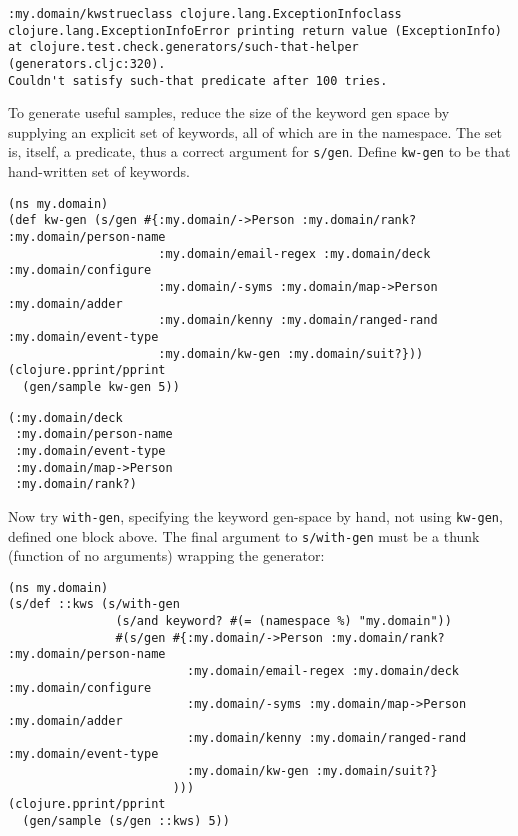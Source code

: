 \documentclass[10pt,oneside,x11names]{article}
\begin{document}
\begin{verbatim}
:my.domain/kwstrueclass clojure.lang.ExceptionInfoclass clojure.lang.ExceptionInfoError printing return value (ExceptionInfo) at clojure.test.check.generators/such-that-helper (generators.cljc:320).
Couldn't satisfy such-that predicate after 100 tries.
\end{verbatim}


To generate useful samples, reduce the size of the keyword gen space by
supplying an explicit set of keywords, all of which are in the namespace. The
set is, itself, a predicate, thus a correct argument for \texttt{s/gen}. Define
\texttt{kw-gen} to be that hand-written set of keywords.

\begin{verbatim}
(ns my.domain)
(def kw-gen (s/gen #{:my.domain/->Person :my.domain/rank? :my.domain/person-name
                     :my.domain/email-regex :my.domain/deck :my.domain/configure
                     :my.domain/-syms :my.domain/map->Person :my.domain/adder
                     :my.domain/kenny :my.domain/ranged-rand :my.domain/event-type
                     :my.domain/kw-gen :my.domain/suit?}))
(clojure.pprint/pprint
  (gen/sample kw-gen 5))
\end{verbatim}

\begin{verbatim}
(:my.domain/deck
 :my.domain/person-name
 :my.domain/event-type
 :my.domain/map->Person
 :my.domain/rank?)
\end{verbatim}


Now try \texttt{with-gen}, specifying the keyword gen-space by hand, not using
\texttt{kw-gen}, defined one block above. The final argument
to \texttt{s/with-gen} must be a thunk (function of no arguments) wrapping the generator:

\begin{verbatim}
(ns my.domain)
(s/def ::kws (s/with-gen
               (s/and keyword? #(= (namespace %) "my.domain"))
               #(s/gen #{:my.domain/->Person :my.domain/rank? :my.domain/person-name
                         :my.domain/email-regex :my.domain/deck :my.domain/configure
                         :my.domain/-syms :my.domain/map->Person :my.domain/adder
                         :my.domain/kenny :my.domain/ranged-rand :my.domain/event-type
                         :my.domain/kw-gen :my.domain/suit?}
                       )))
(clojure.pprint/pprint
  (gen/sample (s/gen ::kws) 5))
\end{verbatim}
\end{document}
